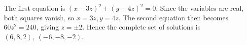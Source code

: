 The first equation is $(x-3z)^2+(y-4z)^2=0$. Since the variables are real, both squares vanish, so $x=3z,y=4z$. The second equation then becomes $60z^2=240$, giving $z=\pm2$. Hence the complete set of solutions is $\boxed{(6,8,2),\ (-6,-8,-2)}$.

